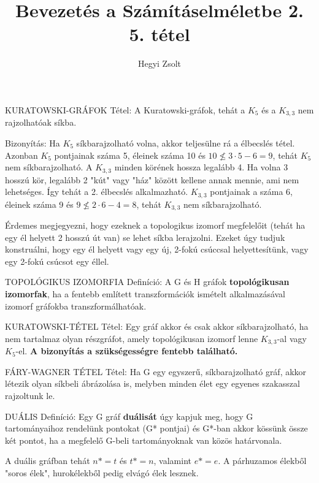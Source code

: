 \documentclass[]{article}
\title{Bevezetés a Számításelméletbe 2.\\{\large 5. tétel}}
\author{Hegyi Zsolt}
\begin{document}
\maketitle
\begin{framed}
KURATOWSKI-GRÁFOK Tétel: A Kuratowski-gráfok, tehát a $K_5$ és a $K_{3,3}$ nem rajzolhatóak síkba.
\end{framed}
\begin{leftbar}
Bizonyítás: Ha $K_5$ síkbarajzolható volna, akkor teljesülne rá a élbecslés tétel. Azonban $K_5$ pontjainak száma 5, éleinek száma 10 és $10 \not\leq 3 \cdot 5 -6 = 9$, tehát $K_5$ nem síkbarajzolható.
A $K_{3,3}$ minden körének hossza legalább 4. Ha volna 3 hosszú kör, legalább 2 "kút" vagy "ház" között kellene annak mennie, ami nem lehetséges. Így tehát a 2. élbecslés alkalmazható. $K_{3,3}$ pontjainak a száma 6, éleinek száma 9 és $9 \not\leq 2 \cdot 6 - 4 = 8$, tehát $K_{3,3}$ nem síkbarajzolható.
\end{leftbar}
Érdemes megjegyezni, hogy ezeknek a topologikus izomorf megfelelőit (tehát ha egy él helyett 2 hosszú út van) se lehet síkba lerajzolni. Ezeket úgy tudjuk konstruálni, hogy egy él helyett vagy egy új, 2-fokú csúccsal helyettesítünk, vagy egy 2-fokú csúcsot egy éllel.
\begin{shaded}
TOPOLÓGIKUS IZOMORFIA Definíció: A G és H gráfok \textbf{topológikusan izomorfak}, ha a fentebb említett transzformációk ismételt alkalmazásával izomorf gráfokba transzformálhatóak.
\end{shaded}
\begin{framed}
KURATOWSKI-TÉTEL Tétel: Egy gráf akkor és csak akkor síkbarajzolható, ha nem tartalmaz olyan részgráfot, amely topológikusan izomorf lenne $K_{3,3}$-al vagy $K_5$-el. \textbf{A bizonyítás a szükségességre fentebb található.}
\end{framed}
\begin{framed}
FÁRY-WAGNER TÉTEL Tétel: Ha G egy egyszerű, síkbarajzolható gráf, akkor létezik olyan síkbeli ábrázolása is, melyben minden élet egy egyenes szakasszal rajzoltunk le.
\end{framed}
\begin{shaded}
DUÁLIS Definíció: Egy G gráf \textbf{duálisát} úgy kapjuk meg, hogy G tartományaihoz rendelünk pontokat (G* pontjai) és G*-ban akkor kössünk össze két pontot, ha a megfelelő G-beli tartományoknak van közös határvonala.
\end{shaded}
A duális gráfban tehát $n* = t$ és $t* = n$, valamint $e* = e$.
A párhuzamos élekből "soros élek", hurokélekből pedig elvágó élek lesznek.
\end{document}
